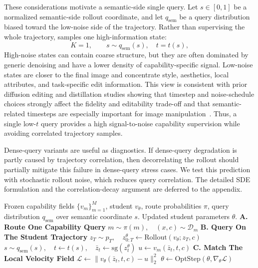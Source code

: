 These considerations motivate a semantic-side single query. Let $s\in[0,1]$ be a normalized semantic-side rollout coordinate, and let $q_{\mathrm{sem}}$ be a query distribution biased toward the low-noise side of the trajectory. Rather than supervising the whole trajectory, \name{} samples one high-information state:
\begin{equation}
  K=1, \qquad s\sim q_{\mathrm{sem}}(s),\quad t=t(s),
  \label{eq:semantic-query}
\end{equation}
High-noise states can contain coarse structure, but they are often dominated by generic denoising and have a lower density of capability-specific signal. Low-noise states are closer to the final image and concentrate style, aesthetics, local attributes, and task-specific edit information. This view is consistent with prior diffusion editing and distillation studies showing that timestep and noise-schedule choices strongly affect the fidelity and editability trade-off and that semantic-related timesteps are especially important for image manipulation~\cite{meng2021sdedit,hertz2022prompt,wang2023not,chen2024tino,lin2024schedule}. Thus, a single low-$t$ query provides a high signal-to-noise capability supervision while avoiding correlated trajectory samples.

Dense-query variants are useful as diagnostics. If dense-query degradation is partly caused by trajectory correlation, then decorrelating the rollout should partially mitigate this failure in dense-query stress cases. We test this prediction with stochastic rollout noise, which reduces query correlation. The detailed SDE formulation and the correlation-decay argument are deferred to the appendix.

\begin{algorithm}[t]
\caption{\textbf{One \name{} Training Step.} A sample is routed to one capability field, queried on a semantic-side student state, and updated by velocity matching.}
\label{alg:danceopd}
\small
\begin{algorithmic}[1]
\Require Frozen capability fields $\{v_m\}_{m=1}^M$, student $v_\theta$, route probabilities $\pi$, query distribution $q_{\mathrm{sem}}$ over semantic coordinate $s$.
\Ensure Updated student parameters $\theta$.
\Statex \textbf{\textcolor{vefblue2}{A.} Route One Capability Query}
\State $m \sim \pi(m),\quad (x,c)\sim\mathcal{D}_m$ 
\Statex \textbf{\textcolor{vefblue3}{B.} Query On The Student Trajectory}
\State $z_T\sim p_T,\quad z_{0:T}^{\theta}\gets \mathrm{Rollout}(v_\theta;z_T,c)$
\State $s\sim q_{\mathrm{sem}}(s),\quad t\gets t(s),\quad \bar z_t\gets \mathrm{sg}(z_t^\theta)$ 
\State $u \gets v_m(\bar z_t,t,c)$ 
\Statex \textbf{\textcolor{vefblue4}{C.} Match The Local Velocity Field}
\State $\mathcal{L}\gets \bigl\|v_\theta(\bar z_t,t,c)-u\bigr\|_2^2$
\State $\theta\gets \mathrm{OptStep}\!\left(\theta,\nabla_\theta\mathcal{L}\right)$
\end{algorithmic}
\end{algorithm}



